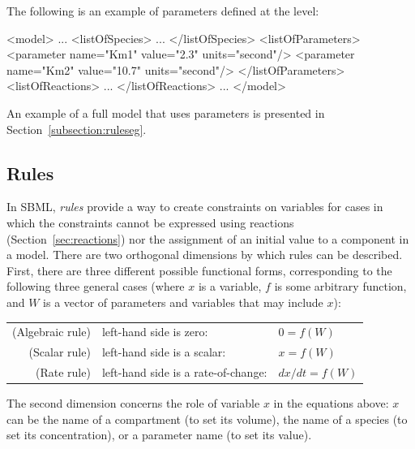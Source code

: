 \documentclass[10pt]{cekarticle}
\newcommand{\changed}[1]{\textcolor{BrickRed}{#1}}
\newenvironment{blockChanged}{\color{BrickRed}}{}
\begin{document}
The following is an example of parameters defined at the  level:

\begin{example}
<model>
    ...
    <listOfSpecies>
        ...
    </listOfSpecies>
    <listOfParameters>
        <parameter name="Km1" value="2.3" units="second"/>
        <parameter name="Km2" value="10.7" units="second"/>
    </listOfParameters>
    <listOfReactions>
        ...
    </listOfReactions>
    ...
</model>
\end{example}

An example of a full model that uses parameters is presented in
Section~\ref{subsection:ruleseg}.


\subsection{Rules}
\label{sec:rules}

In SBML, \emph{rules} provide a way to create constraints on variables for
cases in which the constraints cannot be expressed using \changed{reactions
  (Section~\ref{sec:reactions}) nor the assignment of an initial value to a
  component in a model}.  There are two orthogonal dimensions by which
rules can be described.  First, there are three different possible
functional forms, corresponding to the following three general cases
\changed{(where $x$ is a variable, $f$ is some arbitrary function, and $W$
  is a vector of parameters and variables that may include $x$):}

\begin{blockChanged}
\begin{center}
\begin{tabular}{rll}
(Algebraic rule) & left-hand side is zero:             & $0 = f(W)$\\
(Scalar rule) 	& left-hand side is a scalar:         & $x = f(W)$\\
(Rate rule) 	& left-hand side is a rate-of-change: & $dx/dt = f(W)$
\end{tabular}
\end{center}
\end{blockChanged}

The second dimension concerns the role of variable $x$ in the equations
above: $x$ can be the name of a compartment (to set its volume), the name
of a \changed{species} (to set its concentration), or a parameter name (to
set its value).  
\end{document}

